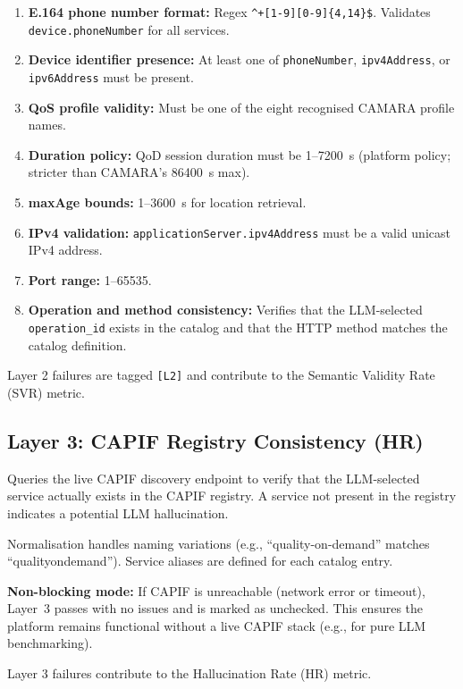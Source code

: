 \documentclass[conference]{IEEEtran}
\begin{document}
\begin{enumerate}[leftmargin=1.5em]
  \item \textbf{E.164 phone number format:} Regex
        \texttt{\^{}+[1-9][0-9]\{4,14\}\$}. Validates \texttt{device.phoneNumber}
        for all services.
  \item \textbf{Device identifier presence:} At least one of
        \texttt{phoneNumber}, \texttt{ipv4Address}, or \texttt{ipv6Address}
        must be present.
  \item \textbf{QoS profile validity:} Must be one of the eight recognised
        CAMARA profile names.
  \item \textbf{Duration policy:} QoD session duration must be
        1–7200~s (platform policy; stricter than CAMARA's 86400~s max).
  \item \textbf{maxAge bounds:} 1–3600~s for location retrieval.
  \item \textbf{IPv4 validation:} \texttt{applicationServer.ipv4Address}
        must be a valid unicast IPv4 address.
  \item \textbf{Port range:} 1–65535.
  \item \textbf{Operation and method consistency:} Verifies that the
        LLM-selected \texttt{operation\_id} exists in the catalog and
        that the HTTP method matches the catalog definition.
\end{enumerate}

Layer 2 failures are tagged \texttt{[L2]} and contribute to the
Semantic Validity Rate (SVR) metric.

\subsection{Layer 3: CAPIF Registry Consistency (HR)}

Queries the live CAPIF discovery endpoint to verify that the LLM-selected
service actually exists in the CAPIF registry. A service not present in
the registry indicates a potential LLM hallucination.

Normalisation handles naming variations (e.g., ``quality-on-demand''
matches ``qualityondemand''). Service aliases are defined for each catalog
entry.

\textbf{Non-blocking mode:} If CAPIF is unreachable (network error or
timeout), Layer~3 passes with no issues and is marked as unchecked.
This ensures the platform remains functional without a live CAPIF stack
(e.g., for pure LLM benchmarking).

Layer 3 failures contribute to the Hallucination Rate (HR) metric.
\end{document}
